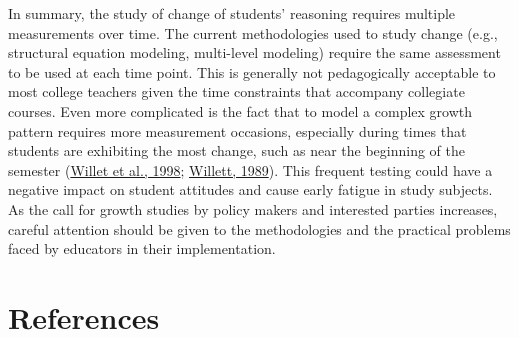 \documentclass[11pt]{umnthesis}
\begin{document}
In summary, the study of change of students' reasoning requires multiple measurements over time. The current methodologies used to study change (e.g., structural equation modeling, multi-level modeling) require the same assessment to be used at each time point. This is generally not pedagogically acceptable to most college teachers given the time constraints that accompany collegiate courses. Even more complicated is the fact that to model a complex growth pattern requires more measurement occasions, especially during times that students are exhibiting the most change, such as near the beginning of the semester (\protect\hyperlink{ref-willet:1998}{Willet et al., 1998}; \protect\hyperlink{ref-willett:1989}{Willett, 1989}). This frequent testing could have a negative impact on student attitudes and cause early fatigue in study subjects. As the call for growth studies by policy makers and interested parties increases, careful attention should be given to the methodologies and the practical problems faced by educators in their implementation.

\hypertarget{references}{%
\chapter*{References}\label{references}}

\noindent

\setlength{\parindent}{-0.20in}
\setlength{\leftskip}{0.20in}
\setlength{\parskip}{8pt}
\end{document}
